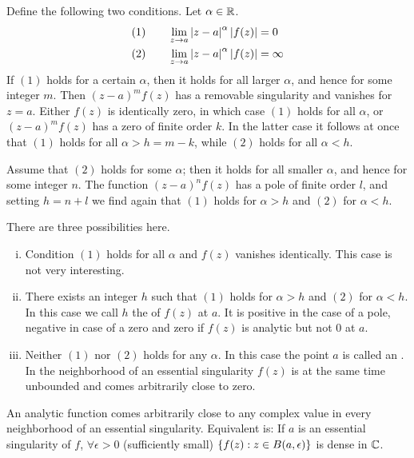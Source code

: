 \begin{theorem}
    Define the following two conditions. Let $\alpha \in \mathbb{R}$.
    \begin{align*}
        (1) \hspace{20pt} &\lim\limits_{z \rightarrow a} \left\vert z-a \right\vert^\alpha \left\vert f(z) \right\vert = 0
        \\
        (2) \hspace{20pt} &\lim\limits_{z \rightarrow a} \left\vert z-a \right\vert^\alpha \left\vert f(z) \right\vert = \infty
    \end{align*}
    If $(1)$ holds for a certain $\alpha$, then it holds for all larger $\alpha$, and
    hence for some integer $m$. Then $(z-a)^m f(z)$ has a removable singularity and
    vanishes for $z=a$. Either $f(z)$ is identically zero, in which case $(1)$ holds
    for all $\alpha$, or $(z-a)^m f(z)$ has a zero of finite order $k$. In the latter
    case it follows at once that $(1)$ holds for all $\alpha > h = m - k$, while $(2)$
    holds for all $\alpha < h$.
    
    Assume that $(2)$ holds for some $\alpha$; then it
    holds for all smaller $\alpha$, and hence for some integer $n$. The function
    $(z-a)^n f(z)$ has a pole of finite order $l$, and setting $h=n+l$ we find again
    that $(1)$ holds for $\alpha > h$ and $(2)$ for $\alpha < h$.

    There are three possibilities here.
    \begin{enumerate}[(i)]
        \item Condition $(1)$ holds for all $\alpha$ and $f(z)$ vanishes identically.
            This case is not very interesting.
        \item There exists an integer $h$ such that $(1)$ holds for $\alpha > h$ and
            $(2)$ for $\alpha < h$. In this case we call $h$ the 
            of $f(z)$ at $a$. It is positive in the case of a pole, negative in case of a
            zero and zero if $f(z)$ is analytic but not $0$ at $a$.
        \item Neither $(1)$ nor $(2)$ holds for any $\alpha$. In this case the point $a$
            is called an . In the neighborhood of
            an essential singularity $f(z)$ is at the same time unbounded and comes
            arbitrarily close to zero.
    \end{enumerate}
\end{theorem}

\begin{theorem}[Weierstrass]
    An analytic function comes arbitrarily close to any complex value in every neighborhood
    of an essential singularity. Equivalent is: If $a$ is an essential singularity of $f$,
    $\forall \epsilon > 0$ (sufficiently small) $\left\{ f(z) : z \in B(a,\epsilon) \right\}$
    is dense in $\mathbb{C}$.
\end{theorem}

